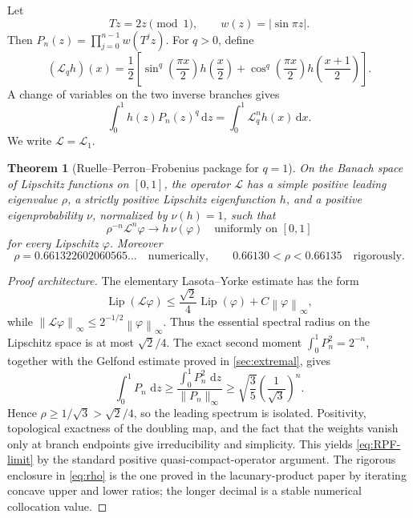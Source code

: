 \documentclass[11pt,oneside]{article}
\newtheorem{theorem}{Theorem}[section]
\theoremstyle{definition}
\theoremstyle{remark}
\newcommand{\dd}{\,\mathrm d}
\newcommand{\Lip}{\operatorname{Lip}}
\newcommand{\Lop}{\mathcal L}
\newcommand{\T}{T}
\newcommand{\norm}[1]{\left\lVert#1\right\rVert}
\begin{document}
Let
\[
 \T z=2z\pmod1,
 \qquad w(z)=|\sin\pi z|.
\]
Then \(P_n(z)=\prod_{j=0}^{n-1}w(\T^jz)\).  For \(q>0\), define
\begin{equation}
 (\Lop_qh)(x)=\frac12\left[
  \sin^q\!\left(\frac{\pi x}{2}\right)h\!\left(\frac x2\right)
 +\cos^q\!\left(\frac{\pi x}{2}\right)h\!\left(\frac{x+1}{2}\right)
 \right].
 \label{eq:Lq}
\end{equation}
A change of variables on the two inverse branches gives
\begin{equation}
 \int_0^1 h(z)P_n(z)^q\dd z
 =\int_0^1\Lop_q^n h(x)\dd x.
 \label{eq:transfer-identity}
\end{equation}
We write \(\Lop=\Lop_1\).

\begin{theorem}[Ruelle--Perron--Frobenius package for \(q=1\)]
\label{thm:RPF}
On the Banach space of Lipschitz functions on \([0,1]\), the operator
\(\Lop\) has a simple positive leading eigenvalue \(\rho\), a strictly
positive Lipschitz eigenfunction \(h\), and a positive eigenprobability
\(\nu\), normalized by \(\nu(h)=1\), such that
\begin{equation}
 \rho^{-n}\Lop^n\varphi
 \longrightarrow h\,\nu(\varphi)
 \quad\text{uniformly on }[0,1]
 \label{eq:RPF-limit}
\end{equation}
for every Lipschitz \(\varphi\).  Moreover
\begin{equation}
 \rho=0.661322602060565\ldots\quad\text{numerically},
 \qquad 0.66130<\rho<0.66135\quad\text{rigorously}.
 \label{eq:rho}
\end{equation}
\end{theorem}

\begin{proof}[Proof architecture]
The elementary Lasota--Yorke estimate has the form
\[
 \Lip(\Lop\varphi)
 \le \frac{\sqrt2}{4}\Lip(\varphi)+C\norm{\varphi}_\infty,
\]
while \(\norm{\Lop\varphi}_\infty\le2^{-1/2}\norm{\varphi}_\infty\).
Thus the essential spectral radius on the Lipschitz space is at most
\(\sqrt2/4\).  The exact second moment \(\int_0^1P_n^2=2^{-n}\), together with the
Gelfond estimate proved in \cref{sec:extremal}, gives
\[
 \int_0^1P_n\,\dd z
 \ge \frac{\int_0^1P_n^2\,\dd z}{\lVert P_n\rVert_\infty}
 \ge \sqrt{\frac35}\left(\frac1{\sqrt3}\right)^n.
\]
Hence \(\rho\ge1/\sqrt3>\sqrt2/4\), so the leading spectrum is isolated.
Positivity, topological exactness of the doubling map, and the fact that the
weights vanish only at branch endpoints give irreducibility and simplicity.
This yields \eqref{eq:RPF-limit} by the standard positive
quasi-compact-operator argument.  The rigorous enclosure in
\eqref{eq:rho} is the one proved in the lacunary-product paper by iterating
concave upper and lower ratios; the longer decimal is a stable numerical
collocation value.
\end{proof}
\end{document}
